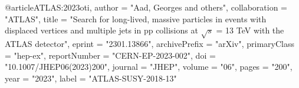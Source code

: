 @article{ATLAS:2023oti,
    author = "Aad, Georges and others",
    collaboration = "ATLAS",
    title = "{Search for long-lived, massive particles in events with displaced vertices and multiple jets in pp collisions at $ \sqrt{s} $ = 13 TeV with the ATLAS detector}",
    eprint = "2301.13866",
    archivePrefix = "arXiv",
    primaryClass = "hep-ex",
    reportNumber = "CERN-EP-2023-002",
    doi = "10.1007/JHEP06(2023)200",
    journal = "JHEP",
    volume = "06",
    pages = "200",
    year = "2023",
    label = "ATLAS-SUSY-2018-13"
}
